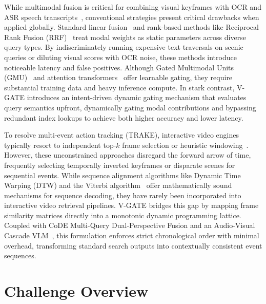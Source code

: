 \documentclass[runningheads]{llncs}
\begin{document}
While multimodal fusion is critical for combining visual keyframes with OCR and ASR speech transcripts~\cite{radford2023robust,du2020ppocr}, conventional strategies present critical drawbacks when applied globally. Standard linear fusion~\cite{dinh2024transforming} and rank-based methods like Reciprocal Rank Fusion (RRF)~\cite{cormack2009reciprocal} treat modal weights as static parameters across diverse query types. By indiscriminately running expensive text traversals on scenic queries or diluting visual scores with OCR noise, these methods introduce noticeable latency and false positives. Although Gated Multimodal Units (GMU)~\cite{arevalo2017gated} and attention transformers~\cite{kiela2018efficient} offer learnable gating, they require substantial training data and heavy inference compute. In stark contrast, V-GATE introduces an intent-driven dynamic gating mechanism that evaluates query semantics upfront, dynamically gating modal contributions and bypassing redundant index lookups to achieve both higher accuracy and lower latency.

To resolve multi-event action tracking (TRAKE), interactive video engines typically resort to independent top-$k$ frame selection or heuristic windowing~\cite{le2026ucese}. However, these unconstrained approaches disregard the forward arrow of time, frequently selecting temporally inverted keyframes or disparate scenes for sequential events. While sequence alignment algorithms like Dynamic Time Warping (DTW) and the Viterbi algorithm~\cite{viterbi1967error} offer mathematically sound mechanisms for sequence decoding, they have rarely been incorporated into interactive video retrieval pipelines. V-GATE bridges this gap by mapping frame similarity matrices directly into a monotonic dynamic programming lattice. Coupled with CoDE Multi-Query Dual-Perspective Fusion and an Audio-Visual Cascade VLM~\cite{yu2023sevila,geminiteam2024gemini}, this formulation enforces strict chronological order with minimal overhead, transforming standard search outputs into contextually consistent event sequences.

%
%
\section{Challenge Overview}
\label{sec:challenge}
\end{document}
